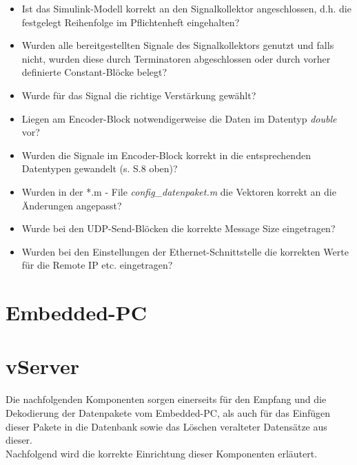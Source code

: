 \documentclass[fontsize = 12pt, paper = a4]{scrreprt}
\begin{document}
\begin{itemize}

\item Ist das Simulink-Modell korrekt an den Signalkollektor angeschlossen, d.h. die festgelegt Reihenfolge im Pflichtenheft eingehalten?

\item Wurden alle bereitgestellten Signale des Signalkollektors genutzt und falls nicht, wurden diese durch Terminatoren abgeschlossen oder durch vorher definierte Constant-Blöcke belegt?

\item Wurde für das Signal die richtige Verstärkung gewählt?

\item Liegen am Encoder-Block notwendigerweise die Daten im Datentyp \textit{double} vor?

\item Wurden die Signale im Encoder-Block korrekt in die entsprechenden Datentypen gewandelt (s. S.8 oben)?

\item Wurden in der *.m - File \textit{config\_datenpaket.m} die Vektoren korrekt an die Änderungen angepasst?

\item Wurde bei den UDP-Send-Blöcken die korrekte Message Size eingetragen?

\item Wurden bei den Einstellungen der Ethernet-Schnittstelle die korrekten Werte für die Remote IP etc. eingetragen?

\end{itemize}

\newpage


\section{Embedded-PC}


\section{vServer}

Die nachfolgenden Komponenten sorgen einerseits für den Empfang und die Dekodierung der Datenpakete vom Embedded-PC, als auch für das Einfügen dieser Pakete in die Datenbank sowie das Löschen veralteter Datensätze aus dieser. \\
Nachfolgend wird die korrekte Einrichtung dieser Komponenten erläutert.
\end{document}
